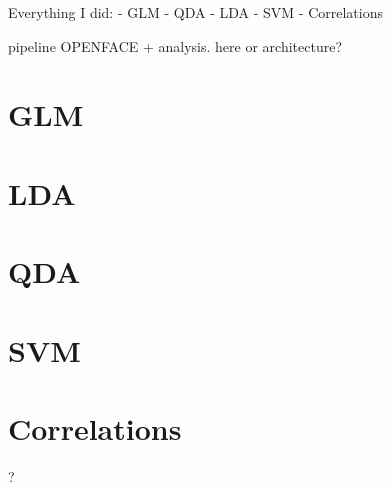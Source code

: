 Everything I did:
- GLM
- QDA
- LDA
- SVM
- Correlations

pipeline OPENFACE + analysis. here or architecture?

\section{GLM}

\section{LDA}

\section{QDA}

\section{SVM}

\section{Correlations} ?